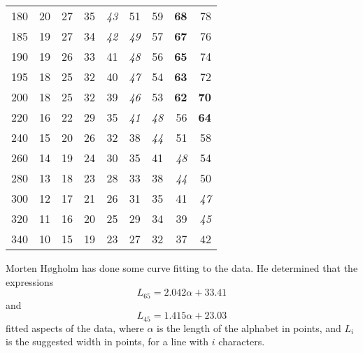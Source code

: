 \documentclass[11pt]{drd-article}
\begin{document}
\begin{table}
\begin{tabular}{r|rrrrrrrr}
180  & 20 & 27 & 35 & \textit{43} & 51 & 59 & \textbf{68} & 78 \\
185  & 19 & 27 & 34 & \textit{42} & \textit{49} & 57 & \textbf{67} & 76 \\
190  & 19 & 26 & 33 & 41 & \textit{48} & 56 & \textbf{65} & 74 \\
195  & 18 & 25 & 32 & 40 & \textit{47} & 54 & \textbf{63} & 72 \\
200  & 18 & 25 & 32 & 39 & \textit{46} & 53 & \textbf{62} & \textbf{70} \\ 
220  & 16 & 22 & 29 & 35 & \textit{41} & \textit{48} & 56 & \textbf{64} \\
240  & 15 & 20 & 26 & 32 & 38 & \textit{44} & 51 & 58 \\
260  & 14 & 19 & 24 & 30 & 35 & 41 & \textit{48} & 54 \\
280  & 13 & 18 & 23 & 28 & 33 & 38 & \textit{44} & 50 \\
300  & 12 & 17 & 21 & 26 & 31 & 35 & 41 & \textit{47} \\
320  & 11 & 16 & 20 & 25 & 29 & 34 & 39 & \textit{45} \\
340  & 10 & 15 & 19 & 23 & 27 & 32 & 37 & 42 \\
\hline
\end{tabular}

\end{table}

Morten H{\o}gholm has done some curve fitting to the data. He determined that the expressions
\begin{equation}
L_{65} = 2.042\alpha + 33.41 \label{eq:L65}
\end{equation}
and
\begin{equation}
L_{45} = 1.415\alpha + 23.03 \label{eq:L45}
\end{equation}
fitted aspects of the data, where $\alpha$ is the length of the alphabet
in points, and $L_{i}$ is the suggested width in points, for a line with
$i$ characters.
\end{document}
